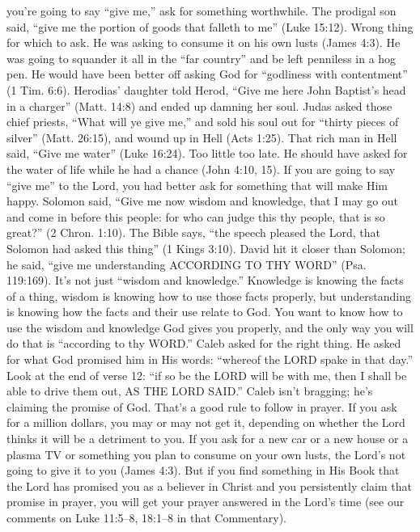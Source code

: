 {you’re going to say “give me,” ask for
something worthwhile. The prodigal son said,
“give me the portion of goods that falleth to
me” (Luke 15:12). Wrong thing for which to
ask. He was asking to consume it on his own
lusts (James 4:3). He was going to squander it
all in the “far country” and be left penniless in
a hog pen. He would have been better off
asking God for “godliness with contentment”
(1 Tim. 6:6).
Herodias’ daughter told Herod, “Give me
here John Baptist’s head in a charger” (Matt.
14:8) and ended up damning her soul. Judas
asked those chief priests, “What will ye give
me,” and sold his soul out for “thirty pieces of
silver” (Matt. 26:15), and wound up in Hell
(Acts 1:25). That rich man in Hell said, “Give
me water” (Luke 16:24). Too little too late. He
should have asked for the water of life while he
had a chance (John 4:10, 15).
If you are going to say “give me” to the
Lord, you had better ask for something that will
make Him happy. Solomon said, “Give me
now wisdom and knowledge, that I may go
out and come in before this people: for who
can judge this thy people, that is so great?”
(2 Chron. 1:10). The Bible says, “the speech
pleased the Lord, that Solomon had asked
this thing” (1 Kings 3:10).
David hit it closer than Solomon; he said,
“give me understanding ACCORDING TO
THY WORD” (Psa. 119:169). It’s not just
“wisdom and knowledge.” Knowledge is
knowing the facts of a thing, wisdom is
knowing how to use those facts properly, but
understanding is knowing how the facts and
their use relate to God. You want to know how
to use the wisdom and knowledge God gives
you properly, and the only way you will do that
is “according to thy WORD.”
Caleb asked for the right thing. He asked
for what God promised him in His words:
“whereof the LORD spake in that day.”
Look at the end of verse 12: “if so be the
LORD will be with me, then I shall be able
to drive them out, AS THE LORD SAID.”
Caleb isn’t bragging; he’s claiming the promise
of God.
That’s a good rule to follow in prayer. If
you ask for a million dollars, you may or may
not get it, depending on whether the Lord
thinks it will be a detriment to you. If you ask
for a new car or a new house or a plasma TV
or something you plan to consume on your own
lusts, the Lord’s not going to give it to you
(James 4:3). But if you find something in His
Book that the Lord has promised you as a
believer in Christ and you persistently claim that
promise in prayer, you will get your prayer
answered in the Lord’s time (see our comments
on Luke 11:5–8, 18:1–8 in that Commentary).}
